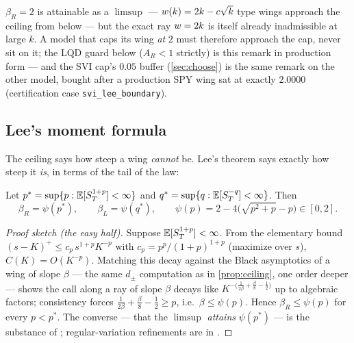 \documentclass[11pt]{article}
\newcommand{\bL}{\beta_L}
\newcommand{\bR}{\beta_R}
\newcommand{\AR}{A_R}
\begin{document}
\begin{remark}
\label{rem:boundary}
$\bR=2$ is attainable as a $\limsup$ --- $w(k)=2k-c\sqrt{k}$ type
wings approach the ceiling from below --- but the exact ray
$w=2k$ is itself already inadmissible at large $k$.  A model that
caps its wing \emph{at} $2$ must therefore approach the cap, never sit
on it; the LQD guard below ($\AR<1$ strictly) is this remark in
production form --- and the SVI cap's $0.05$ buffer
(\cref{sec:choose}) is the same remark on the other model, bought after
a production SPY wing sat at exactly $2.0000$ (certification case
\texttt{svi\_lee\_boundary}).
\end{remark}

\subsection{Lee's moment formula}

The ceiling says how steep a wing \emph{cannot} be.  Lee's theorem says
exactly how steep it \emph{is}, in terms of the tail of the law:

\begin{theorem}
\label{thm:lee}
Let $p^{*}=\sup\{p:\mathbb{E}[S_T^{1+p}]<\infty\}$ and
$q^{*}=\sup\{q:\mathbb{E}[S_T^{-q}]<\infty\}$.  Then
\begin{equation}
\boxed{\;\bR=\psi(p^{*}),\qquad \bL=\psi(q^{*}),\qquad
\psi(p)=2-4\big(\sqrt{p^{2}+p}-p\big)\in[0,2].\;}
\label{eq:psi}
\end{equation}
\end{theorem}

\begin{proof}[Proof sketch (the easy half)]
Suppose $\mathbb{E}[S_T^{1+p}]<\infty$.  From the elementary bound
$(s-K)^{+}\le c_p\,s^{1+p}K^{-p}$ with $c_p=p^{p}/(1+p)^{1+p}$
(maximize over $s$), $C(K)=O(K^{-p})$.  Matching this decay against the
Black asymptotics of a wing of slope $\beta$ --- the same $d_\pm$
computation as in \cref{prop:ceiling}, one order deeper --- shows the
call along a ray of slope $\beta$ decays like
$K^{-\big(\frac{1}{2\beta}+\frac{\beta}{8}-\frac12\big)}$ up to
algebraic factors; consistency forces
$\frac{1}{2\beta}+\frac{\beta}{8}-\frac12\ge p$, i.e.\
$\beta\le\psi(p)$.  Hence $\bR\le\psi(p)$ for every $p<p^{*}$.  The
converse --- that the $\limsup$ \emph{attains} $\psi(p^{*})$ --- is the
substance of \cite{Lee2004}; regular-variation refinements are in
\cite{BenaimFriz2009}.
\end{proof}
\end{document}
